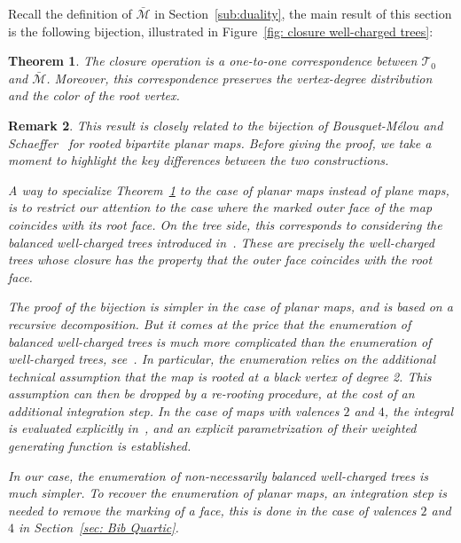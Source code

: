 \documentclass[11pt,reqno,tbtags]{amsart}
\newtheorem{theo}{Theorem}
\newtheorem{rema}[theo]{Remark}
\numberwithin{equation}{section}
\numberwithin{theo}{section}
\theoremstyle{definition}
\begin{document}
Recall the definition of $\bar{\mathcal{M}}$ in Section~\ref{sub:duality}, the main result of this section is the following bijection, illustrated in Figure~\ref{fig: closure well-charged trees}:

\begin{theo}\label{theo: Bijection Bipartite maps}
The closure operation is a one-to-one correspondence between $\mathcal{T}_0$ and $\bar{\mathcal{M}}$.
Moreover, this correspondence preserves the vertex-degree distribution and the color of the root vertex.
\end{theo}

\begin{rema}
This result is closely related to the bijection of Bousquet-Mélou and Schaeffer~\cite{BousquetMelouSchaeffer_Bipartite} for rooted bipartite planar maps. Before giving the proof, we take a moment to highlight the key differences between the two constructions.

A way to specialize Theorem~\ref{theo: Bijection Bipartite maps} to the case of planar maps instead of plane maps, is to restrict our  attention to the case where the marked outer face of the map  coincides with its root face. On the tree side, this corresponds to considering the \emph{balanced} well-charged trees introduced in~\cite{BousquetMelouSchaeffer_Bipartite}. These are precisely the well-charged trees whose closure has the property that the outer face coincides with the root face.

	The proof of the bijection is simpler in the case of planar maps, and is based on a recursive decomposition. But it comes at the price that the enumeration of balanced well-charged trees is much more complicated than the enumeration of well-charged trees, see~\cite[Section~5]{BousquetMelouSchaeffer_Bipartite}. In particular, the enumeration relies on the additional technical assumption that the map is rooted at a black vertex of degree 2. This assumption can then be dropped by a re-rooting procedure, at the cost of an additional integration step. In the case of maps with valences $2$ and $4$, the integral is evaluated explicitly in~\cite[Section~7.3]{BousquetMelouSchaeffer_Bipartite}, and an explicit parametrization of their weighted generating function is established.
	
	In our case, the enumeration of non-necessarily balanced well-charged trees is much simpler. To recover the enumeration of planar maps, an integration step is needed to remove the marking of a face, this is done in the case of valences $2$ and $4$ in Section~\ref{sec: Bib Quartic}.
	\end{rema}
\end{document}
